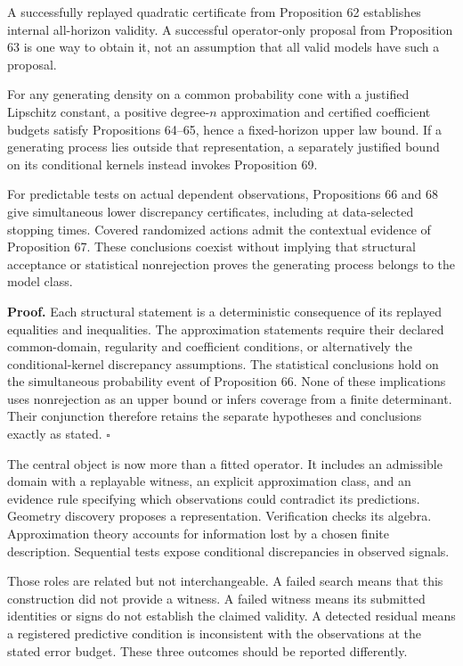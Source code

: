 \documentclass[11pt,letterpaper]{article}
\begin{document}
A successfully replayed quadratic certificate from Proposition 62
establishes internal all-horizon validity. A successful operator-only
proposal from Proposition 63 is one way to obtain it, not an assumption
that all valid models have such a proposal.

For any generating density on a common probability cone with a justified
Lipschitz constant, a positive degree-\(n\) approximation and certified
coefficient budgets satisfy Propositions 64--65, hence a fixed-horizon
upper law bound. If a generating process lies outside that
representation, a separately justified bound on its conditional kernels
instead invokes Proposition 69.

For predictable tests on actual dependent observations, Propositions 66
and 68 give simultaneous lower discrepancy certificates, including at
data-selected stopping times. Covered randomized actions admit the
contextual evidence of Proposition 67. These conclusions coexist without
implying that structural acceptance or statistical nonrejection proves
the generating process belongs to the model class.

\textbf{Proof.} Each structural statement is a deterministic consequence
of its replayed equalities and inequalities. The approximation
statements require their declared common-domain, regularity and
coefficient conditions, or alternatively the conditional-kernel
discrepancy assumptions. The statistical conclusions hold on the
simultaneous probability event of Proposition 66. None of these
implications uses nonrejection as an upper bound or infers coverage from
a finite determinant. Their conjunction therefore retains the separate
hypotheses and conclusions exactly as stated. \(\square\)

The central object is now more than a fitted operator. It includes an
admissible domain with a replayable witness, an explicit approximation
class, and an evidence rule specifying which observations could
contradict its predictions. Geometry discovery proposes a
representation. Verification checks its algebra. Approximation theory
accounts for information lost by a chosen finite description. Sequential
tests expose conditional discrepancies in observed signals.

Those roles are related but not interchangeable. A failed search means
that this construction did not provide a witness. A failed witness means
its submitted identities or signs do not establish the claimed validity.
A detected residual means a registered predictive condition is
inconsistent with the observations at the stated error budget. These
three outcomes should be reported differently.
\end{document}
